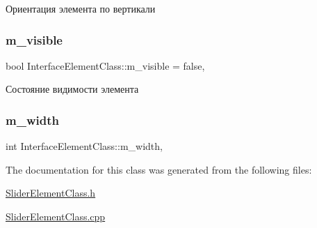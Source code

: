 Ориентация элемента по вертикали 

\mbox{\label{class_interface_element_class_a734e2f12d7ca918619dda46ac2c4e56e}} 
\subsubsection{\texorpdfstring{m\+\_\+visible}{m\_visible}}
{\footnotesize\ttfamily bool Interface\+Element\+Class\+::m\+\_\+visible = false\hspace{0.3cm}{\ttfamily [protected]}, {\ttfamily [inherited]}}



Состояние видимости элемента 

\mbox{\label{class_interface_element_class_a0327b9790dee1416249b9cdedeb0154c}} 
\subsubsection{\texorpdfstring{m\+\_\+width}{m\_width}}
{\footnotesize\ttfamily int Interface\+Element\+Class\+::m\+\_\+width\hspace{0.3cm}{\ttfamily [protected]}, {\ttfamily [inherited]}}



The documentation for this class was generated from the following files\+:\begin{DoxyCompactItemize}
\item 
\hyperlink{_slider_element_class_8h}{Slider\+Element\+Class.\+h}\item 
\hyperlink{_slider_element_class_8cpp}{Slider\+Element\+Class.\+cpp}\end{DoxyCompactItemize}
